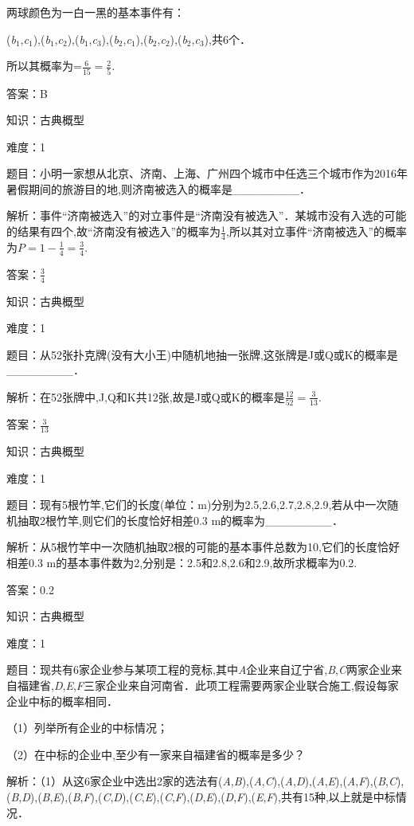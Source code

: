 \documentclass{article} %
\begin{document}
两球颜色为一白一黑的基本事件有：

(\textit{b}${}_{1}$,\textit{c}${}_{1}$),(\textit{b}${}_{1}$,\textit{c}${}_{2}$),(\textit{b}${}_{1}$,\textit{c}${}_{3}$),(\textit{b}${}_{2}$,\textit{c}${}_{1}$),(\textit{b}${}_{2}$,\textit{c}${}_{2}$),(\textit{b}${}_{2}$,\textit{c}${}_{3}$),共6个．

所以其概率为=$\frac{6}{15}=\frac{2}{5}$.

答案：B

知识：古典概型

难度：1

题目：小明一家想从北京、济南、上海、广州四个城市中任选三个城市作为2016年暑假期间的旅游目的地,则济南被选入的概率是\_\_\_\_\_\_\_\_．

解析：事件``济南被选入''的对立事件是``济南没有被选入''．某城市没有入选的可能的结果有四个,故``济南没有被选入''的概率为$\frac{1}{4}$,所以其对立事件``济南被选入''的概率为$P=1-\frac{1}{4}=\frac{3}{4}$.

答案：$\frac{3}{4}$

知识：古典概型

难度：1

题目：从52张扑克牌(没有大小王)中随机地抽一张牌,这张牌是J或Q或K的概率是\_\_\_\_\_\_\_\_．

解析：在52张牌中,J,Q和K共12张,故是J或Q或K的概率是$\frac{12}{52}=\frac{3}{13}$.

答案：$\frac{3}{13}$

知识：古典概型

难度：1

题目：现有5根竹竿,它们的长度(单位：m)分别为2.5,2.6,2.7,2.8,2.9,若从中一次随机抽取2根竹竿,则它们的长度恰好相差0.3 m的概率为\_\_\_\_\_\_\_\_．

解析：从5根竹竿中一次随机抽取2根的可能的基本事件总数为10,它们的长度恰好相差0.3 m的基本事件数为2,分别是：2.5和2.8,2.6和2.9,故所求概率为0.2.

答案：0.2

知识：古典概型

难度：1

题目：现共有6家企业参与某项工程的竞标,其中\textit{A}企业来自辽宁省,\textit{B},\textit{C}两家企业来自福建省,\textit{D},\textit{E},\textit{F}三家企业来自河南省．此项工程需要两家企业联合施工,假设每家企业中标的概率相同．

（1）列举所有企业的中标情况；

（2）在中标的企业中,至少有一家来自福建省的概率是多少？

解析：（1）从这6家企业中选出2家的选法有(\textit{A},\textit{B}),(\textit{A},\textit{C}),(\textit{A},\textit{D}),(\textit{A},\textit{E}),(\textit{A},\textit{F}),(\textit{B},\textit{C}),(\textit{B},\textit{D}),(\textit{B},\textit{E}),(\textit{B},\textit{F}),(\textit{C},\textit{D}),(\textit{C},\textit{E}),(\textit{C},\textit{F}),(\textit{D},\textit{E}),(\textit{D},\textit{F}),(\textit{E},\textit{F}),共有15种,以上就是中标情况．
\end{document}
